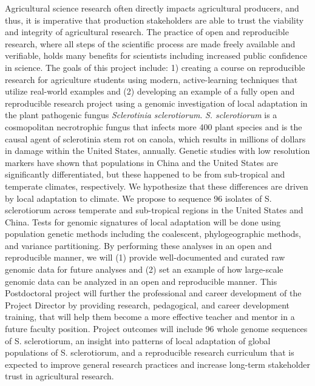 \documentclass[12pt,letterpaper]{article}
\begin{document}
Agricultural science research often directly impacts agricultural producers, and thus, it is imperative that production stakeholders are able to trust the viability and integrity of agricultural research. 
The practice of open and reproducible research, where all steps of the scientific process are made freely available and verifiable, holds many benefits for scientists including increased public confidence in science. 
The goals of this project include: 1) creating a course on reproducible research for agriculture students using modern, active-learning techniques that utilize real-world examples and (2) developing an example of a fully open and reproducible research project using a genomic investigation of local adaptation in the plant pathogenic fungus \textit{Sclerotinia sclerotiorum}. 
\textit{S. sclerotiorum} is a cosmopolitan necrotrophic fungus that infects more 400 plant species and is the causal agent of sclerotinia stem rot on canola, which results in millions of dollars in damage within the United States, annually. 
Genetic studies with low resolution markers have shown that populations in China and the United States are significantly differentiated, but these happened to be from sub-tropical and temperate climates, respectively. 
We hypothesize that these differences are driven by local adaptation to climate. 
We propose to sequence 96 isolates of S. sclerotiorum across temperate and sub-tropical regions in the United States and China. 
Tests for genomic signatures of local adaptation will be done using population genetic methods including the coalescent, phylogeographic methods, and variance partitioning. 
By performing these analyses in an open and reproducible manner, we will (1) provide well-documented and curated raw genomic data for future analyses and (2) set an example of how large-scale genomic data can be analyzed in an open and reproducible manner. 
This Postdoctoral project will further the professional and career development of the  Project Director by providing research, pedagogical, and career development training, that will help them become a more effective teacher and mentor in a future faculty position. 
Project outcomes will include 96 whole genome sequences of S. sclerotiorum, an insight into patterns of local adaptation of global populations of S. sclerotiorum, and a reproducible research curriculum that is expected to improve general research practices and increase long-term stakeholder trust in agricultural research. 
\end{document}
